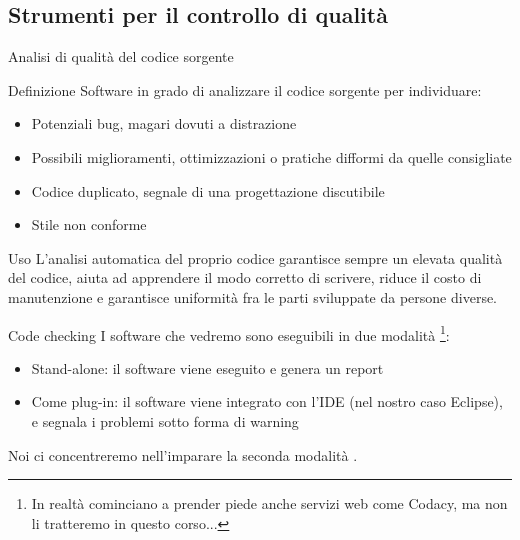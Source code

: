 \documentclass[presentation]{beamer}
\begin{document}
\subsection{Strumenti per il controllo di qualità}
\begin{frame}{Analisi di qualità  del codice sorgente}
	\begin{block}{Definizione}
		Software in grado di analizzare il codice sorgente per individuare:
		\begin{itemize}
			\item Potenziali bug, magari dovuti a distrazione
			\item Possibili miglioramenti, ottimizzazioni o pratiche difformi da quelle consigliate
			\item Codice duplicato, segnale di una progettazione discutibile
			\item Stile non conforme
		\end{itemize}
	\end{block}
	\begin{block}{Uso}
		L'analisi automatica del proprio codice garantisce sempre un elevata qualità  del codice, aiuta ad apprendere il modo corretto di scrivere, riduce il costo di manutenzione e garantisce uniformità  fra le parti sviluppate da persone diverse.
	\end{block}
\end{frame}

\begin{frame}[allowframebreaks]{Code checking}
	I software che vedremo sono eseguibili in due modalità \footnote{In realtà  cominciano a prender piede anche servizi web come Codacy, ma non li tratteremo in questo corso...}:
	\begin{itemize}
		\item Stand-alone: il software viene eseguito e genera un report
		\item Come plug-in: il software viene integrato con l'IDE (nel nostro caso Eclipse), e segnala i problemi sotto forma di warning
	\end{itemize}
	Noi ci concentreremo nell'imparare la seconda modalità .
\end{frame}
\end{document}
